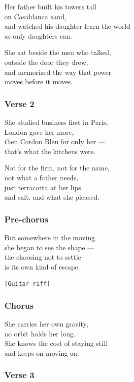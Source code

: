 \documentclass[]{article}
\begin{document}
Her father built his towers tall\\
on Casablanca sand,\\
and watched his daughter learn the world\\
as only daughters can.

She sat beside the men who talked,\\
outside the door they drew,\\
and memorized the way that power\\
moves before it moves.

\subsubsection{Verse 2}\label{verse-2-1}

She studied business first in Paris,\\
London gave her more,\\
then Cordon Bleu for only her ---\\
that's what the kitchens were.

Not for the firm, not for the name,\\
not what a father needs,\\
just terracotta at her lips\\
and salt, and what she pleased.

\subsubsection{Pre-chorus}\label{pre-chorus}

But somewhere in the moving\\
she began to see the shape ---\\
the choosing not to settle\\
is its own kind of escape.

\texttt{{[}Guitar\ riff{]}}

\subsubsection{Chorus}\label{chorus-5}

She carries her own gravity,\\
no orbit holds her long.\\
She knows the cost of staying still\\
and keeps on moving on.

\subsubsection{Verse 3}\label{verse-3-1}
\end{document}
